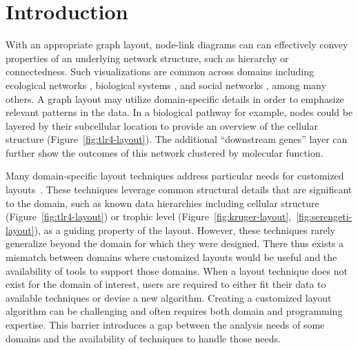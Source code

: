 \section{Introduction}
With an appropriate graph layout, node-link diagrams can
can effectively convey properties of an underlying
network structure, such as hierarchy or connectedness. Such visualizations are common across domains including ecological networks
\cite{hinke2004visualizing,harper2006dynamic,lavigne1996cod,baskerville2011spatial,yodzis1998local,cohen2003ecological,kearney2016blog,benson2016higher,kruger2017},
biological systems
\cite{barsky2008cerebral,shannon2003cytoscape,gehlenborg2010visualization,saraiya2005visualizing,becker2001graph},
and social networks
\cite{scott1988social,travers1967small,granovetter1973strength,watts1998collective,freeman1978centrality,rothenberg1998using}, 
among many others. A graph layout may utilize
domain-specific details in order to emphasize relevant patterns in the
data. 
In a biological pathway for example, nodes could be layered by their 
subcellular location to provide an overview of the cellular structure
(Figure~\ref{fig:tlr4-layout}). The additional ``downstream genes'' layer
can further show the outcomes of this network clustered by molecular function.

\tlrfourLayout

Many domain-specific layout techniques address particular needs
for customized layouts~\cite{barsky2008cerebral,shannon2003cytoscape,kearney2017d3,kearney2017ecopath}. These
techniques leverage common structural details that are significant to the
domain, such as known data hierarchies including cellular 
structure (Figure~\ref{fig:tlr4-layout}) or trophic level
(Figure~\ref{fig:kruger-layout},~\ref{fig:serengeti-layout}), as a guiding property of the
layout. However, these techniques rarely generalize beyond the domain for
which they were designed. There thus exists a mismatch between domains
where customized layouts would be useful and the availability of tools to
support those domains. When a layout technique does not exist for the
domain of interest, users are required to either fit their data
to available techniques or devise a new algorithm. Creating a
customized layout algorithm can be challenging and often requires both
domain and programming expertise.
This barrier introduces a gap between the 
analysis needs of some domains and the availability of techniques to
handle those needs.

